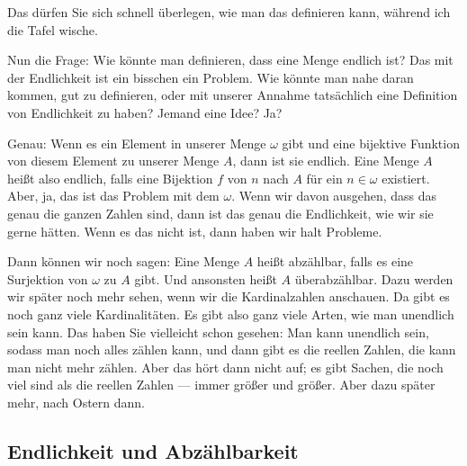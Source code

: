 \begin{spoken-clean}[01:05:16 - 01:07:09]
Das dürfen Sie sich schnell überlegen, wie man das definieren kann, während ich die Tafel wische.

Nun die Frage: Wie könnte man definieren, dass eine Menge endlich ist? Das mit der Endlichkeit ist ein bisschen ein Problem. Wie könnte man nahe daran kommen,  gut zu definieren, oder mit unserer Annahme tatsächlich eine Definition von Endlichkeit zu haben? Jemand eine Idee? Ja?

Genau: Wenn es ein Element in unserer Menge $\omega$ gibt und eine bijektive Funktion von diesem Element zu unserer Menge $A$, dann ist sie endlich. Eine Menge $A$ heißt also endlich, falls eine Bijektion $f$ von $n$ nach $A$ für ein $n \in \omega$ existiert. Aber, ja, das ist das Problem mit dem $\omega$. Wenn wir davon ausgehen, dass das genau die ganzen Zahlen sind, dann ist das genau die Endlichkeit, wie wir sie gerne hätten. Wenn es das nicht ist, dann haben wir halt Probleme.
\end{spoken-clean}

\begin{spoken-clean}[01:07:09 - 01:08:36]
Dann können wir noch sagen: Eine Menge $A$ heißt abzählbar, falls es eine Surjektion von $\omega$ zu $A$ gibt. Und ansonsten heißt $A$ überabzählbar. Dazu werden wir später noch mehr sehen, wenn wir die Kardinalzahlen anschauen. Da gibt es noch ganz viele Kardinalitäten. Es gibt also ganz viele Arten, wie man unendlich sein kann. Das haben Sie vielleicht schon gesehen: Man kann unendlich sein, sodass man noch alles zählen kann, und dann gibt es die reellen Zahlen, die kann man nicht mehr zählen. Aber das hört dann nicht auf; es gibt Sachen, die noch viel  sind als die reellen Zahlen --- immer größer und größer. Aber dazu später mehr, nach Ostern dann.
\end{spoken-clean}

\subsection{Endlichkeit und Abzählbarkeit}

\begin{math-stroke}


\end{math-stroke}

